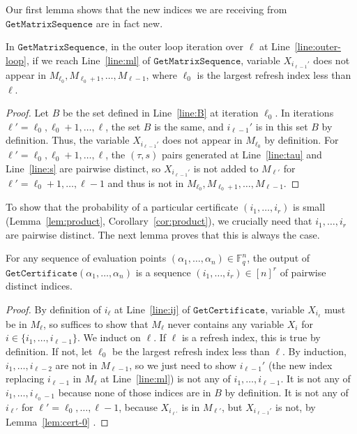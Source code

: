\documentclass{article}[11pt]
\begin{document}
Our first lemma shows that the new indices we are receiving from $\mathtt{GetMatrixSequence}$ are in fact new.

\begin{lemma}
  In $\mathtt{GetMatrixSequence}$, in the outer loop iteration over $\ell$ at Line~\ref{line:outer-loop}, if we reach Line~\ref{line:ml} of $\mathtt{GetMatrixSequence}$, variable $X_{i_{\ell-1}'}$ does not appear in $M_{\ell_0},M_{\ell_0+1},\dots,M_{\ell-1}$, where $\ell_0$ is the largest refresh index less than $\ell$.
  \label{lem:cert-0}
\end{lemma}
\begin{proof}
   Let $B$ be the set defined in Line~\ref{line:B} at iteration $\ell_0$.
   In iterations $\ell'=\ell_0,\ell_0+1,\dots,\ell$, the set $B$ is the same, and $i_{\ell-1}'$ is in this set $B$ by definition.
   Thus, the variable $X_{i_{\ell-1}'}$ does not appear in $M_{\ell_0}$ by definition.
   For $\ell'=\ell_0,\ell_0+1,\dots,\ell$, the $(\tau,s)$ pairs generated at Line~\ref{line:tau} and Line~\ref{line:s} are pairwise distinct, so $X_{i_{\ell-1}'}$ is not added to $M_{\ell'}$ for $\ell'=\ell_0+1,\dots,\ell-1$ and thus is not in $M_{\ell_0},M_{\ell_0+1},\dots,M_{\ell-1}$.
\end{proof}

To show that the probability of a particular certificate $(i_1,\dots,i_r)$ is small (Lemma~\ref{lem:product}, Corollary~\ref{cor:product}), we crucially need that $i_1,\dots,i_r$ are pairwise distinct.
The next lemma proves that this is always the case.
\begin{lemma}
  For any sequence of evaluation points $(\alpha_1,\dots,\alpha_n) \in \mathbb{F}_q^n$, the output of $\mathtt{GetCertificate}(\alpha_1,\dots,\alpha_n)$ is a sequence $(i_1,\dots,i_r) \in [n]^r$ of pairwise distinct indices.
  \label{lem:distinct}
\end{lemma}
\begin{proof}
  By definition of $i_\ell$ at Line~\ref{line:ij} of $\mathtt{GetCertificate}$, variable $X_{i_\ell}$ must be in $M_\ell$, so suffices to show that $M_\ell$ never contains any variable $X_i$ for $i\in\{i_1,\dots,i_{\ell-1}\}$.
  We induct on $\ell$.
  If $\ell$ is a refresh index, this is true by definition.
  If not, let $\ell_0$ be the largest refresh index less than $\ell$.
  By induction, $i_1,\dots,i_{\ell-2}$ are not in $M_{\ell-1}$, so we just need to show $i_{\ell-1}'$ (the new index replacing $i_{\ell-1}$ in $M_{\ell}$ at Line~\ref{line:ml}) is not any of $i_1,\dots,i_{\ell-1}$.
  It is not any of $i_1,\dots,i_{\ell_0-1}$ because none of those indices are in $B$ by definition.
  It is not any of $i_{\ell'}$ for $\ell'=\ell_0,\dots,\ell-1$, because $X_{i_{\ell'}}$ is in $M_{\ell'}$, but $X_{i_{\ell-1}'}$ is not, by Lemma~\ref{lem:cert-0} .
\end{proof}
\end{document}
